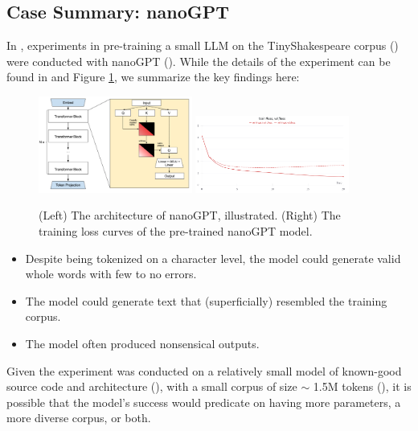 \documentclass{article} %
\theoremstyle{definition}
\begin{document}
\subsection{Case Summary: nanoGPT} \label{sec:cs-nanogpt}
In \cite{wk8}, experiments in pre-training a small LLM on the TinyShakespeare corpus (\cite{tinyss, tinyss2}) were
conducted with nanoGPT (\cite{nanoGPT}). While the details of the experiment can be found in \cite{wk8} and 
Figure \ref{fig:nanoGPT-sample}, we summarize the key findings here: 
\begin{figure}
    \centering
    \includegraphics[width=0.45\textwidth, height=0.15\textheight]{images/gpt_arch.png}
    \includegraphics[width=0.45\textwidth, height=0.15\textheight]{images/loss_curves.png}
    \caption{(Left) The architecture of nanoGPT, illustrated. (Right) The training loss curves of the pre-trained nanoGPT model.}
    \label{fig:nanoGPT-sample}
\end{figure}

\begin{itemize}
    \item Despite being tokenized on a character level, the model could generate valid whole words
         with few to no errors.
    \item The model could generate text that (superficially) resembled the training corpus.
    \item The model often produced nonsensical outputs.
\end{itemize}

Given the experiment was conducted on a relatively small model
of known-good source code and architecture (\cite{nanoGPT}),
with a small corpus of size $\sim$ 1.5M tokens (\cite{tinyss, tinyss2}), 
it is possible that the model's success would predicate on 
having more parameters, a more diverse corpus, or both.
\end{document}
